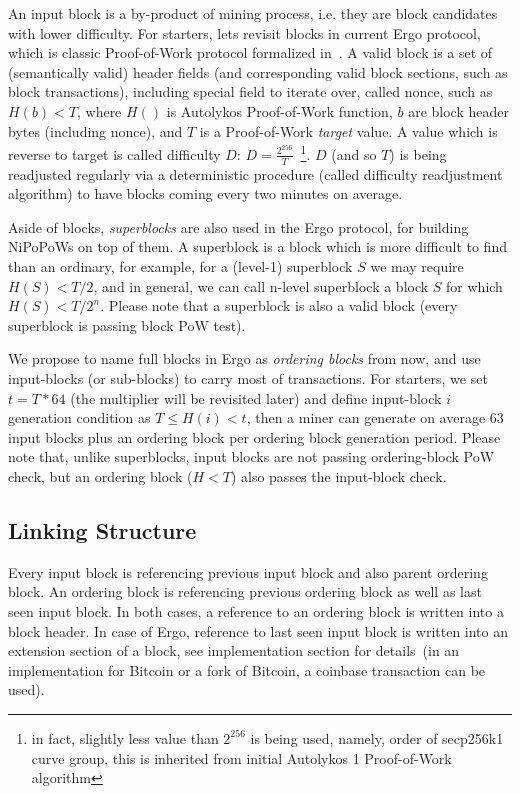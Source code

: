 \documentclass{llncs}
\begin{document}
An input block is a by-product of mining process, i.e. they are block candidates with lower difficulty. For starters,
lets revisit blocks in current Ergo protocol, which is classic Proof-of-Work protocol formalized in~\cite{garay2024bitcoin}. A valid block
is a set of (semantically valid) header fields (and corresponding valid block sections, such as block transactions),
including special field to iterate over, called nonce, such as $H(b) < T$, where $H()$ is Autolykos Proof-of-Work
function, $b$ are block header bytes (including nonce), and $T$ is a Proof-of-Work \textit{target} value. A value which is reverse
to target is called difficulty $D$: $D = \frac{2^{256}}{T}$~\footnote{in fact, slightly less value than $2^{256}$ is being used, namely, order of
secp256k1 curve group, this is inherited from initial Autolykos 1 Proof-of-Work algorithm}. $D$ (and so $T$) is being readjusted
regularly via a deterministic procedure (called difficulty readjustment algorithm) to have blocks coming every two minutes on average.

Aside of blocks, \textit{superblocks} are also used in the Ergo protocol, for building NiPoPoWs on top of them. A superblock is
a block which is more difficult to find than an ordinary, for example, for a (level-1) superblock $S$ we may require
$H(S) < T/2$, and in general, we can call n-level superblock a block $S$ for which $H(S) < T/2^n$. Please note that a
superblock is also a valid block (every superblock is passing block PoW test).

We propose to name full blocks in Ergo as \textit{ordering blocks} from now, and use input-blocks (or sub-blocks) to carry most
of transactions. For starters, we set $t = T * 64$ (the multiplier will be revisited later) and define input-block $i$ generation
condition as $T \le H(i) < t$, then a miner can generate on average 63 input blocks plus an ordering block
per ordering block generation period. Please note that, unlike superblocks, input blocks are not passing ordering-block PoW check,
but an ordering block ($H < T$) also passes the input-block check.

\subsection{Linking Structure}
\label{subsec:linking-structure}

Every input block is referencing previous input block and also parent ordering block. An ordering block is referencing
previous ordering block as well as last seen input block. In both cases, a reference to an ordering block is written into
a block header. In case of Ergo, reference to last seen input block is written into an extension section of a block, see
implementation section for details~(in an implementation for Bitcoin or a fork of Bitcoin, a coinbase transaction can be used).
\end{document}
